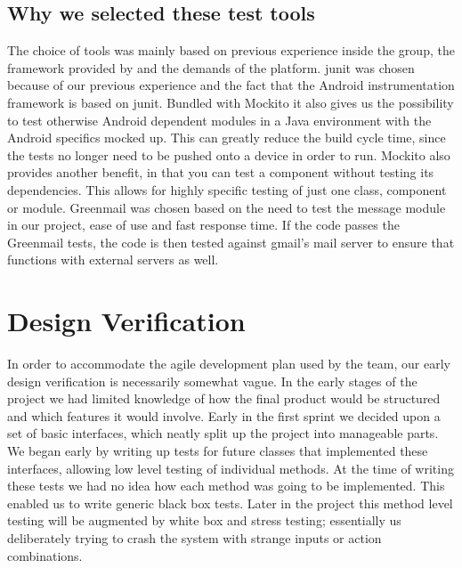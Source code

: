 \subsection{Why we selected these test tools}
The choice of tools was mainly based on previous experience inside the group, the framework provided by and the demands of the platform. 
\newline
\newline
\gls{junit} was chosen because of our previous experience and the fact that the Android instrumentation framework is based on \gls{junit}. Bundled with Mockito it also gives us the possibility to test otherwise Android dependent modules in a Java environment with the Android specifics mocked up. This can greatly reduce the build cycle time, since the tests no longer need to be pushed onto a device in order to run. Mockito also provides another benefit, in that you can test a component without testing its dependencies. This allows for highly specific testing of just one class, component or module.
\newline
\newline
Greenmail was chosen based on the need to test the message module in our project, ease of use and fast response time. If the code passes the Greenmail tests, the code is then tested against gmail’s mail server to ensure that functions with external servers as well. 


\section{Design Verification}
In order to accommodate the agile development plan used by the team, our early design verification is necessarily somewhat vague. In the early stages of the project we had limited knowledge of how the final product would be structured and which features it would involve.
\newline
\newline
Early in the first sprint we decided upon a set of basic interfaces, which neatly split up the project into manageable parts. We began early by writing up tests for future classes that implemented these interfaces, allowing low level testing of individual methods. At the time of writing these tests we had no idea how each method was going to be implemented. This enabled us to write generic black box tests.
\newline
\newline
Later in the project this method level testing will be augmented by white box and stress testing; essentially us deliberately trying to crash the system with strange inputs or action combinations. 
